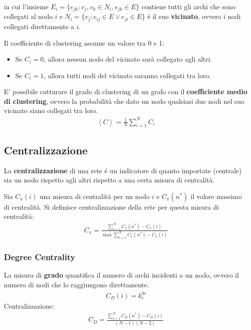 in cui l'insieme $E_i = \{e_{jk} : v_j, v_k \in N_i, e_{jk} \in E\}$ contiene tutti gli archi che sono collegati al nodo $i$ e $N_i = \{v_j : e_{ij} \in E \lor e_{ji} \in E \}$ é il suo \textbf{vicinato}, ovvero i nodi collegati direttamente a $i$.

Il coefficiente di clustering assume un valore tra 0 e 1:
\begin{itemize}
  \item Se $C_i = 0$, allora nessun nodo del vicinato sarà collegato agli altri.
  \item Se $C_i = 1$, allora tutti nodi del vicinato saranno collegati tra loro.
\end{itemize}

E' possibile catturare il grado di clustering di un grafo con il \textbf{coefficiente medio di clustering}, ovvero la probabilità che dato un nodo qualsiasi due nodi nel suo vicinato siano collegati tra loro.
\begin{align*}
  \left\langle C \right\rangle = \frac{1}{N} \sum_{i=1}^N C_i
\end{align*}

\subsection*{Centralizzazione}
La \textbf{centralizzazione} di una rete é un indicatore di quanto importate (centrale) sia un nodo rispetto agli altri rispetto a una certa misura di centralità.

Sia $C_x(i)$ una misura di centralità per un nodo $i$ e $C_x(n^*)$ il valore massimo di centralità. Si definisce centralizzazione della rete per questa misura di centralità:
\begin{align*}
  C_x = \frac{\sum_{i=1}^N C_x(n^*) - C_x(i)}{\max \sum_{i=1}^N C_x(n^*) - C_x(i) }
\end{align*}

\subsubsection*{Degree Centrality}
La misura di \textbf{grado} quantifica il numero di archi incidenti a un nodo, ovvero il numero di nodi che lo raggiungono direttamente.
\begin{align*}
  C_D(i) = k_i^{\text{in}}
\end{align*}
%
Centralizzazione:
\begin{align*}
  C_D = \frac{\sum_{i=1}^N C_D(n^*) - C_D(i)}{(N - 1) (N - 2)}
\end{align*}


